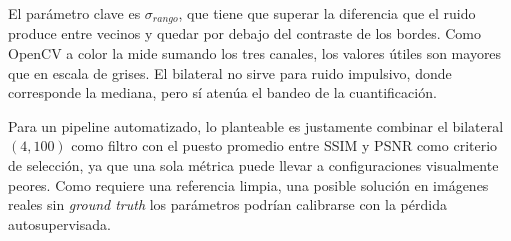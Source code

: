         El parámetro clave es $\sigma_{rango}$, que tiene que superar la diferencia que el ruido produce entre vecinos y quedar por debajo del contraste de los bordes. Como OpenCV a color la mide sumando los tres canales, los valores útiles son mayores que en escala de grises. El bilateral no sirve para ruido impulsivo, donde corresponde la mediana, pero sí atenúa el bandeo de la cuantificación.

        Para un pipeline automatizado, lo planteable es justamente combinar el bilateral $(4, 100)$ como filtro con el puesto promedio entre SSIM y PSNR como criterio de selección, ya que una sola métrica puede llevar a configuraciones visualmente peores. Como requiere una referencia limpia, una posible solución en imágenes reales sin \textit{ground truth} los parámetros podrían calibrarse con la pérdida autosupervisada.

